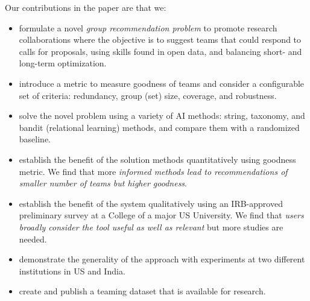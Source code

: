 Our contributions in the paper are that we:
\begin{itemize}
    \item formulate a novel {\em  group  recommendation problem} to  promote research collaborations where the objective is to suggest teams that could respond to calls for proposals, using skills found in open data, and balancing short- and long-term optimization.
    \item introduce a metric to measure goodness of teams and consider a configurable set of criteria: redundancy, group (set) size, coverage, and robustness.
    \item solve the novel problem using a variety of AI methods: string, taxonomy, and bandit (relational learning) methods, and compare them with a randomized baseline.
    \item  establish the benefit of the solution methods quantitatively using goodness metric. We find that more {\em informed methods lead to recommendations of smaller number of teams but higher goodness}.
    \item  establish the benefit of the system qualitatively using an IRB-approved preliminary survey at a College of a major US University. We find that {\em users broadly consider the tool useful as well as relevant} but more studies are needed. 
    \item demonstrate the generality of the approach with experiments at  two different institutions in US and India.  
    \item create and publish a teaming dataset that is available for research.

\end{itemize}